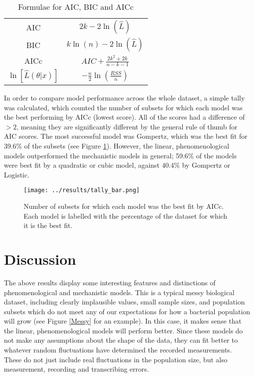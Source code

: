 \documentclass[11pt,a4wide,titlepage]{article}
\begin{document}
\begin{table}
	\begin{center}
\caption{Formulae for AIC, BIC and AICc}\label{aic}
\def\arraystretch{1.5}
\begin{tabular}{|c|c|}
	\hline
	AIC & $2k - 2\ln(\hat{L})$\\
	BIC & $k\ln(n) - 2\ln(\hat{L})$\\
	AICc & $AIC + \frac{2k^2 + 2k}{n - k - 1}$\\
	$\ln[\hat{L}(\theta|x)]$ & $-\frac{n}{2}\ln(\frac{RSS}{n})$\\
	\hline
\end{tabular}
\end{center}
\end{table}


In order to compare model performance across the whole dataset, a simple tally was calculated, which counted the number of subsets for which each model was the best performing by AICc (lowest score). All of the scores had a difference of $>2$, meaning they are significantly different by the general rule of thumb for AIC scores. The most successful model was Gompertz, which was the best fit for 39.6\% of the subsets (see Figure \ref{tally}). However, the linear, phenomenological models outperformed the mechanistic models in general; 59.6\% of the models were best fit by a quadratic or cubic model, against 40.4\% by Gompertz or Logistic.



\begin{figure}[H]
	\begin{center}
		\texttt{[image: ../results/tally\_bar.png]}\\
		\caption{Number of subsets for which each model was the best fit by AICc. Each model is labelled with the percentage of the dataset for which it is the best fit.}\label{tally}
	\end{center}
	\end{figure}




\section*{Discussion}
The above results display some interesting features and distinctions of phenomenological and mechanistic models. This  is a typical messy biological dataset, including clearly implausible values, small sample sizes, and population subsets which do not meet any of our expectations for how a bacterial population will grow (see Figure \ref{Messy} for an example). In this case, it makes sense that the linear, phenomenological models will perform better. Since these models do not make any assumptions about the shape of the data, they can fit better to whatever random fluctuations have determined the recorded measurements. These do not just include real fluctuations in the population size, but also measurement, recording and transcribing errors. 
\end{document}
